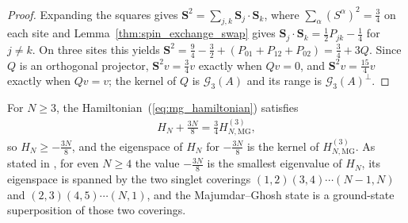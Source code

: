 \begin{proof}
    \leanok
    Expanding the squares gives $\mathbf S^{2}=\sum_{j,k}\mathbf S_j\cdot\mathbf S_k$,
    where $\sum_\alpha(S^\alpha)^{2}=\tfrac34$ on each site and
    Lemma~\ref{thm:spin_exchange_swap} gives
    $\mathbf S_j\cdot\mathbf S_k=\tfrac12P_{jk}-\tfrac14$ for $j\neq k$. On
    three sites this yields
    $\mathbf S^{2}=\tfrac94-\tfrac32+(P_{01}+P_{12}+P_{02})=\tfrac34+3Q$. Since
    $Q$ is an orthogonal projector, $\mathbf S^{2}v=\tfrac34v$ exactly when $Qv=0$,
    and $\mathbf S^{2}v=\tfrac{15}4v$ exactly when $Qv=v$; the kernel of $Q$ is
    $\mathcal G_{3}(A)$ and its range is $\mathcal G_{3}(A)^{\perp}$.
\end{proof}

\begin{lemma}%
    \label{thm:majumdar_ghosh_review_hamiltonian}
    \leanok
    For $N\ge3$, the Hamiltonian~(\ref{eq:mg_hamiltonian}) satisfies
    \begin{align}
        H_{N}+\tfrac{3N}{8}=\tfrac34H_{N,\mathrm{MG}}^{(3)},
        \label{eq:mg_hamiltonian_projectors}
    \end{align}
    so $H_{N}\ge-\tfrac{3N}{8}$, and the eigenspace of $H_{N}$ for
    $-\tfrac{3N}{8}$ is the kernel of $H_{N,\mathrm{MG}}^{(3)}$. As stated in
    \cite[Appendix~A, ``The Majumdar-Ghosh model'']{Cirac2021Matrix}, for even
    $N\ge4$ the value $-\tfrac{3N}{8}$ is the smallest eigenvalue of $H_{N}$,
    its eigenspace is spanned by the two singlet coverings
    $(1,2)(3,4)\cdots(N-1,N)$ and $(2,3)(4,5)\cdots(N,1)$, and the
    Majumdar--Ghosh state is a ground-state superposition of those two
    coverings.
\end{lemma}

